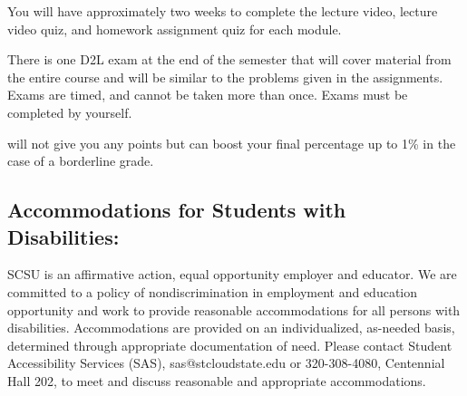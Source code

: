 \documentclass{tufte-handout}
\begin{document}
You will have approximately two weeks to complete the lecture video, lecture video quiz, and homework assignment quiz for each module.

\begin{fullwidth}

 There is one D2L exam at the end of the semester that will cover material from the entire course and will be similar to the problems given in the assignments. Exams are timed, and cannot be taken more than once. Exams must be completed by yourself.



 will not give you any points but can boost your final percentage up to 1\% in the case of a borderline grade.






\subsection{Accommodations for Students with Disabilities: } 

SCSU is an affirmative action, equal opportunity employer and educator. We are committed to a policy of nondiscrimination in employment and education opportunity and work to provide reasonable accommodations for all persons with disabilities. Accommodations are provided on an individualized, as-needed basis, determined through appropriate documentation of need. Please contact Student Accessibility Services (SAS), sas@stcloudstate.edu or 320-308-4080, Centennial Hall 202, to meet and discuss reasonable and appropriate accommodations. 






\end{fullwidth}
\end{document}
